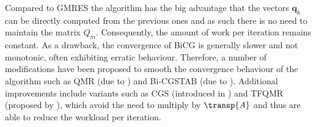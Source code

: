 Compared to GMRES the algorithm has the big advantage that the vectors $\bm{q}_{k}$ can be directly computed from the previous ones and as such there is no need to maintain the matrix $Q_m$. Consequently, the amount of work per iteration remains constant. As a drawback, the convergence of BiCG is generally slower and not monotonic, often exhibiting erratic behaviour. Therefore, a number of modifications have been proposed to smooth the convergence behaviour of the algorithm such as QMR (due to \cite{freund_qmr_1991}) and Bi-CGSTAB (due to \cite{van_der_vorst_bi-cgstab_1992}). Additional improvements include variants such as CGS (introduced in \cite{sonneveld_cgs_1989}) and TFQMR (proposed by \cite{freund_transpose-free_1994}), which avoid the need to multiply by $\transp{A}$ and thus are able to reduce the workload per iteration.
